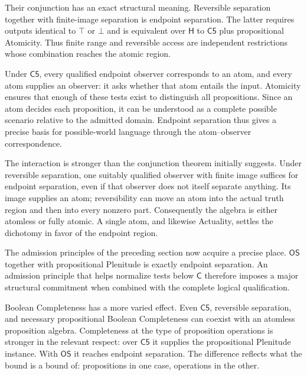 \documentclass[12pt,letterpaper]{article}
\newcommand{\Hlogic}{\mathsf{H}}
\newcommand{\C}{\mathsf{C}}
\newcommand{\Cfive}{\mathsf{C5}}
\newcommand{\OS}{\mathsf{OS}}
\begin{document}
Their conjunction has an exact structural meaning. Reversible separation together with finite-image separation is endpoint separation. The latter requires outputs identical to $\top$ or $\bot$ and is equivalent over $\Hlogic$ to $\Cfive$ plus propositional Atomicity. Thus finite range and reversible access are independent restrictions whose combination reaches the atomic region.


Under $\Cfive$, every qualified endpoint observer corresponds to an atom, and every atom supplies an observer: it asks whether that atom entails the input. Atomicity ensures that enough of these tests exist to distinguish all propositions. Since an atom decides each proposition, it can be understood as a complete possible scenario relative to the admitted domain. Endpoint separation thus gives a precise basis for possible-world language through the atom--observer correspondence.~\cite[\S3]{r9}


The interaction is stronger than the conjunction theorem initially suggests. Under reversible separation, one suitably qualified observer with finite image suffices for endpoint separation, even if that observer does not itself separate anything. Its image supplies an atom; reversibility can move an atom into the actual truth region and then into every nonzero part. Consequently the algebra is either atomless or fully atomic. A single atom, and likewise Actuality, settles the dichotomy in favor of the endpoint region.~\cite[\S6]{r9}


The admission principles of the preceding section now acquire a precise place. $\OS$ together with propositional Plenitude is exactly endpoint separation. An admission principle that helps normalize tests below $\C$ therefore imposes a major structural commitment when combined with the complete logical qualification.~\cite{r8}


Boolean Completeness has a more varied effect. Even $\Cfive$, reversible separation, and necessary propositional Boolean Completeness can coexist with an atomless proposition algebra. Completeness at the type of proposition operations is stronger in the relevant respect: over $\Cfive$ it supplies the propositional Plenitude instance. With $\OS$ it reaches endpoint separation. The difference reflects what the bound is a bound of: propositions in one case, operations in the other.~\cite[\S4]{r13}
\end{document}
